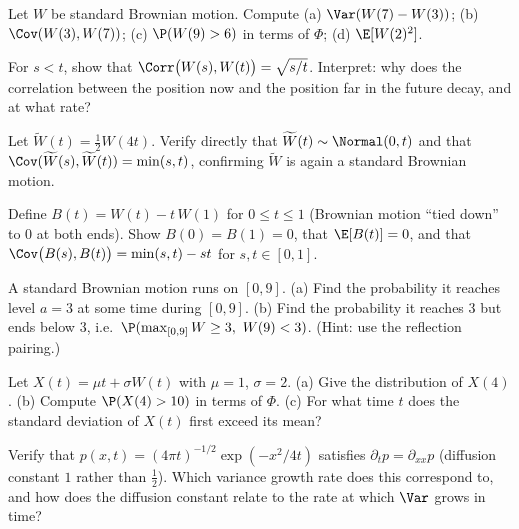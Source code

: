 \begin{exercise}
Let $W$ be standard Brownian motion. Compute (a) $\Var(W(7)-W(3))$;
(b) $\Cov(W(3),W(7))$; (c) $\P(W(9)>6)$ in terms of $\Phi$; (d) $\E[W(2)^2]$.
\end{exercise}

\begin{exercise}
For $s<t$, show that
$\Corr\big(W(s),W(t)\big) = \sqrt{s/t}$. Interpret: why does the correlation
between the position now and the position far in the future decay, and at what
rate?
\end{exercise}

\begin{exercise}
Let $\widetilde W(t) = \tfrac{1}{2}W(4t)$. Verify directly that
$\widetilde W(t)\sim\Normal(0,t)$ and that
$\Cov(\widetilde W(s),\widetilde W(t)) = \min(s,t)$, confirming
$\widetilde W$ is again a standard Brownian motion.
\end{exercise}

\begin{exercise}
Define $B(t) = W(t) - t\,W(1)$ for $0\le t\le1$ (Brownian motion ``tied down'' to
$0$ at both ends). Show $B(0)=B(1)=0$, that $\E[B(t)]=0$, and that
$\Cov\big(B(s),B(t)\big) = \min(s,t) - st$ for $s,t\in[0,1]$.
\end{exercise}

\begin{exercise}
A standard Brownian motion runs on $[0,9]$. (a) Find the probability it reaches
level $a=3$ at some time during $[0,9]$. (b) Find the probability it reaches $3$
but ends below $3$, i.e.\ $\P(\max_{[0,9]}W\ge3,\ W(9)<3)$.
(Hint: use the reflection pairing.)
\end{exercise}

\begin{exercise}
Let $X(t)=\mu t + \sigma W(t)$ with $\mu=1$, $\sigma=2$. (a) Give the distribution
of $X(4)$. (b) Compute $\P(X(4)>10)$ in terms of $\Phi$. (c) For what time $t$
does the standard deviation of $X(t)$ first exceed its mean?
\end{exercise}

\begin{exercise}
Verify that $p(x,t)=(4\pi t)^{-1/2}\exp(-x^2/4t)$ satisfies
$\partial_t p = \partial_{xx}p$ (diffusion constant $1$ rather than $\tfrac12$).
Which variance growth rate does this correspond to, and how does the diffusion
constant relate to the rate at which $\Var$ grows in time?
\end{exercise}

